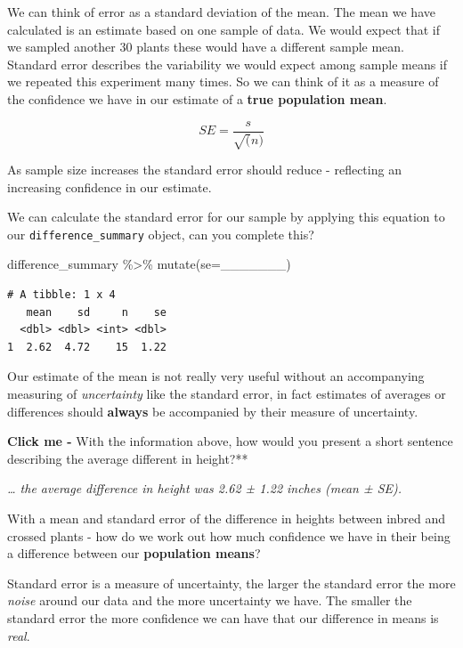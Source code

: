 \documentclass[
]{book}
\newenvironment{Shaded}{\begin{snugshade}}{\end{snugshade}}
\newcommand{\AttributeTok}[1]{\textcolor[rgb]{0.77,0.63,0.00}{#1}}
\newcommand{\FunctionTok}[1]{\textcolor[rgb]{0.00,0.00,0.00}{#1}}
\newcommand{\NormalTok}[1]{#1}
\newcommand{\SpecialCharTok}[1]{\textcolor[rgb]{0.00,0.00,0.00}{#1}}
\begin{document}
We can think of error as a standard deviation of the mean. The mean we have calculated is an estimate based on one sample of data. We would expect that if we sampled another 30 plants these would have a different sample mean. Standard error describes the variability we would expect among sample means if we repeated this experiment many times. So we can think of it as a measure of the confidence we have in our estimate of a \textbf{true population mean}.

\[
SE = \frac{s}{\sqrt(n)}
\]

As sample size increases the standard error should reduce - reflecting an increasing confidence in our estimate.

We can calculate the standard error for our sample by applying this equation to our \texttt{difference\_summary} object, can you complete this?

\begin{Shaded}
\begin{Highlighting}[]
\NormalTok{difference\_summary }\SpecialCharTok{\%\textgreater{}\%} 
  \FunctionTok{mutate}\NormalTok{(}\AttributeTok{se=}\NormalTok{\_\_\_\_\_\_\_)}
\end{Highlighting}
\end{Shaded}

\begin{verbatim}
# A tibble: 1 x 4
   mean    sd     n    se
  <dbl> <dbl> <int> <dbl>
1  2.62  4.72    15  1.22
\end{verbatim}

Our estimate of the mean is not really very useful without an accompanying measuring of \emph{uncertainty} like the standard error, in fact estimates of averages or differences should \textbf{always} be accompanied by their measure of uncertainty.

\textbf{Click me -} With the information above, how would you present a short sentence describing the average different in height?**

\emph{\ldots{} the average difference in height was 2.62 ± 1.22 inches (mean ± SE).}

With a mean and standard error of the difference in heights between inbred and crossed plants - how do we work out how much confidence we have in their being a difference between our \textbf{population means}?

Standard error is a measure of uncertainty, the larger the standard error the more \emph{noise} around our data and the more uncertainty we have. The smaller the standard error the more confidence we can have that our difference in means is \emph{real}.
\end{document}
